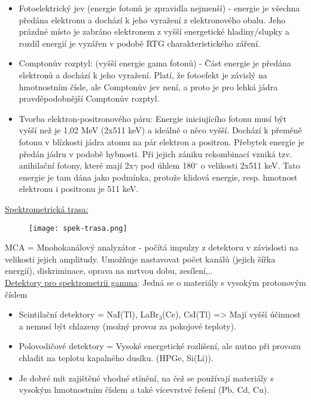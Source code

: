 \begin{itemize}
    \item Fotoelektrický jev (energie fotonů je zpravidla nejmenší) - energie je všechna předána elektronu a dochází k jeho vyražení z elektronového obalu. Jeho prázdné místo je zabráno elektronem z vyšší energetické hladiny/slupky a rozdíl energií je vyzářen v podobě RTG charakteristického záření.

    \item Comptonův rozptyl: (vyšší energie gama fotonů) - Část energie je předána elektronů a dochází k jeho vyražení. Platí, že fotoefekt je závislý na hmotnostním čísle, ale Comptonův jev není, a proto je pro lehká jádra pravděpodobnější Comptonův rozptyl.

    \item Tvorba elektron-positronového páru: Energie iniciujícího fotonu musí být vyšší než je 1,02 MeV (2x511 keV) a ideálně o něco vyšší. Dochází k přeměně fotonu v blízkosti jádra atomu na pár elektron a positron. Přebytek energie je předán jádru v podobě hybnosti. Při jejich zániku rekombinací vzniká tzv. anihilační fotony, které mají 2x$\gamma$ pod úhlem 180$^\circ$ o velikosti 2x511 keV. Tato energie je tam dána jako podmínka, protože klidová energie, resp. hmotnost elektronu i positronu je 511 keV.
\end{itemize}


\underline{Spektrometrická trasa:}

\begin{figure}[ht!]
\centering
	\texttt{[image: spek-trasa.png]}
\end{figure}

MCA = Mnohokanálový analyzátor - počítá impulzy z detektoru v závislosti na velikosti jejich amplitudy. Umožňuje nastavovat počet kanálů (jejich šířka energií), diskriminace, oprava na mrtvou dobu, zesílení,..
\\

\underline{Detektory pro spektrometrii gamma}: Jedná se o materiály s vysokým protonovým číslem
\begin{itemize}
    \item Scintilační detektory = NaI(Tl), LaBr$_3$(Ce), CsI(Tl) => Mají vyšší účinnost a nemusí být chlazeny (možný provoz za pokojové teploty).
    \item Polovodičové detektory = Vysoké energetické rozlišení, ale nutno při provozu chladit na teplotu kapalného dusíku. (HPGe, Si(Li)).
    \item Je dobré mít zajištěné vhodné stínění, na čež se používají materiály s vysokým hmotnostním číslem a také vícevrstvé řešení (Pb, Cd, Cu).
\end{itemize}


